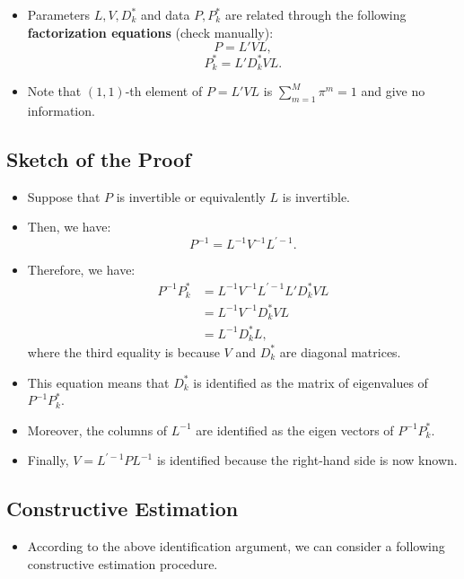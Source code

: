 \documentclass[
]{book}
\providecommand{\tightlist}{%
  \setlength{\itemsep}{0pt}\setlength{\parskip}{0pt}}
\begin{document}
\begin{itemize}
\tightlist
\item
  Parameters \(L, V, D_k^*\) and data \(P, P_k^*\) are related through the following \textbf{factorization equations} (check manually):
  \[
  P = L' V L,
  \]
  \[
  P_k^* = L'D_k^*VL.
  \]
\item
  Note that \((1, 1)\)-th element of \(P = L'VL\) is \(\sum_{m = 1}^M \pi^m = 1\) and give no information.
\end{itemize}

\hypertarget{sketch-of-the-proof}{%
\subsection{Sketch of the Proof}\label{sketch-of-the-proof}}

\begin{itemize}
\tightlist
\item
  Suppose that \(P\) is invertible or equivalently \(L\) is invertible.
\item
  Then, we have:
  \[
  P^{-1} = L^{-1}V^{-1} L^{'-1}.
  \]
\item
  Therefore, we have:
  \[
  \begin{split}
  P^{-1} P_k^* &= L^{-1}V^{-1} L^{'-1} L'D_k^*VL\\
  &= L^{-1} V^{-1} D_k^* V L\\
  &= L^{-1} D_k^* L,
  \end{split}
  \]
  where the third equality is because \(V\) and \(D_k^*\) are diagonal matrices.
\item
  This equation means that \(D_k^*\) is identified as the matrix of eigenvalues of \(P^{-1} P_k^*\).
\item
  Moreover, the columns of \(L^{-1}\) are identified as the eigen vectors of \(P^{-1} P_k^*\).
\item
  Finally, \(V = L^{'-1} P L^{-1}\) is identified because the right-hand side is now known.
\end{itemize}

\hypertarget{constructive-estimation}{%
\subsection{Constructive Estimation}\label{constructive-estimation}}

\begin{itemize}
\tightlist
\item
  According to the above identification argument, we can consider a following constructive estimation procedure.
\end{itemize}
\end{document}
